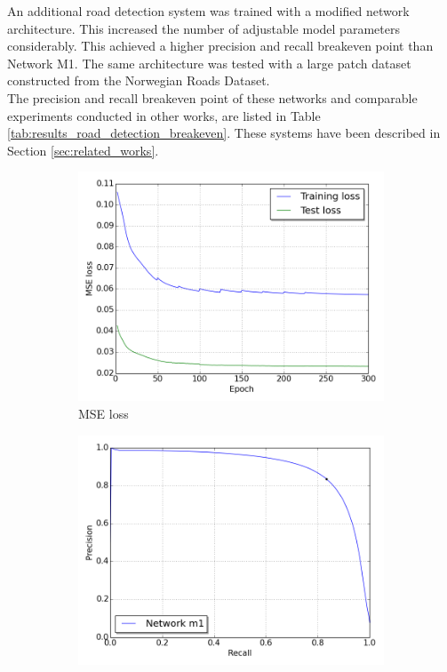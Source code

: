 An additional road detection system was trained with a modified network architecture. This increased the number of adjustable model parameters considerably. This achieved a higher precision and recall breakeven point than Network M1. The same architecture was tested with a large patch dataset constructed from the Norwegian Roads Dataset.\\

The precision and recall breakeven point of these networks and comparable experiments conducted in other works, are listed in Table \ref{tab:results_road_detection_breakeven}. These systems have been described in Section \ref{sec:related_works}.\\

 
\begin{figure}
\begin{subfigure}{0.5\textwidth}
\includegraphics[width=\linewidth]{figs/E7/E7_lc_loss.png}
\caption{MSE loss} \label{fig:E7_performance_mass_lc}
\end{subfigure}
\hspace*{\fill} %
\begin{subfigure}{0.5\textwidth}
\includegraphics[width=\linewidth]{figs/E7/E7_pr.png}

\end{subfigure}
\end{figure}
